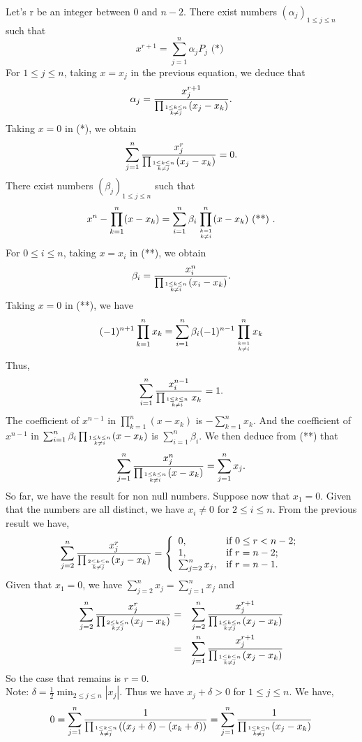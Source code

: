 \documentclass[a4paper,12pt]{article}
\begin{document}
\medskip
Let's r be an integer between $0$ and $n-2$.  There exist numbers
$(\alpha_j)_{1 \le j \le n}$ such that
\[x^{r+1} = \sum_{j = 1}^{n} \alpha_j P_j\mbox{ (*) }\]
For $1 \le j \le n$, taking $x = x_j$ in the previous equation, we
deduce that
\[ \alpha_j = \frac{x_j^{r+1}}{\prod_{1 \le k \le n \atop k \not= j}(x_j -
  x_k)}.\]
Taking $x = 0$ in (*), we obtain
\[ \sum_{j=1}^n\frac{x_j^r}
{\prod_{1\le k \le n \atop k \not= j}(x_j
- x_k)} = 0.\]
There exist numbers $(\beta_j)_{1 \le j \le n}$ such that
\[ x^n - \prod_{k=1}^n(x - x_k) = 
\sum_{i=1}^n \beta_i \prod_{k=1\atop k\not=i}^n(x - x_k)\mbox{ (**) }.\]
For $0 \le i \le n$, taking $x = x_i$ in (**), we obtain
\[ \beta_i = \frac{x_i^n}{\prod_{1\le k \le n\atop k\not=i}(x_i -
  x_k)}.\]
Taking $x = 0$ in (**), we have
\[(-1)^{n+1}\prod_{k=1}^nx_k =
\sum_{i=1}^n \beta_i (-1)^{n-1} \prod_{k=1 \atop k\not= i}^n x_k\]
Thus,
\[\sum_{i=1}^n \frac{x_i^{n-1}}{\prod_{1\le k \le n \atop k\not= i}
  x_k} = 1.\]
The coefficient of $x^{n-1}$ in $\prod_{k=1}^n(x - x_k)$ is 
$-\sum_{k=1}^nx_k$.  And the coefficient of $x^{n-1}$ in 
$\sum_{i=1}^n \beta_i \prod_{1\le k\le n \atop k \not= i}(x - x_k)$ is
$\sum_{i=1}^n\beta_i$.  We then deduce from (**) that
\[\sum_{j=1}^n\frac{x_j^n}{\prod_{1\le k \le n\atop k\not= i}(x -
  x_k)} = \sum_{j=1}^nx_j.\]
So far, we have the result for non null numbers.  Suppose now that
$x_1 = 0$.  Given that the numbers are all distinct, we have
$x_i \not= 0$ for $2 \le i \le n$.  From the previous result we have,
\[\sum_{j=2}^n\frac{x_j^r}{\prod_{2\le k\le n\atop k\not= j}(x_j -
  x_k)} =
\left\{ \begin{array}{ll}
0, & \mbox{if } 0 \le r < n-2;\\
1, & \mbox{if } r = n-2;\\
\sum_{j=2}^{n}x_j, & \mbox{if } r = n-1. 
\end{array}\right. \]
Given that $x_1 = 0$, we have $\sum_{j=2}^nx_j = \sum_{j=1}^nx_j$ and
\begin{eqnarray*}
\sum_{j=2}^n \frac{x_j^r}{\prod_{2\le k\le n\atop k\not= j}(x_j -
  x_k)} &=& \sum_{j=2}^n 
\frac{x_j^{r+1}}{\prod_{1\le k \le n\atop k\not= j}(x_j - x_k)}\\&=&
\sum_{j=1}^n 
\frac{x_j^{r+1}}{\prod_{1\le k \le n\atop k\not= j}(x_j - x_k)}
\end{eqnarray*}
So the case that remains is $r = 0$.  \\
Note: $\delta = \frac{1}{2}\min_{2\le j \le n} | x_j|.$ Thus we have
$x_j + \delta > 0$ for $1 \le j \le n$.  We have,
\[0 = \sum_{j=1}^n \frac{1}
{\prod_{1\le k\le n\atop k\not= j}((x_j + \delta)- (x_k+\delta))} =
\sum_{j=1}^n\frac{1}{\prod_{1\le k\le n\atop k\not= j}(x_j - x_k)}\]
\end{document}
